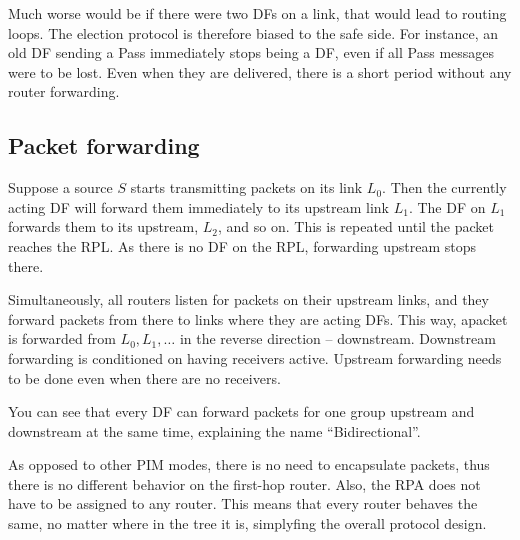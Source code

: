 Much worse would be if there were two DFs on a link, that would lead to routing loops. The election protocol
is therefore biased to the safe side. For instance, an old DF sending a Pass immediately
stops being a DF, even if all Pass messages were to be lost. Even when they are
delivered, there is a short period without any router forwarding.

\subsection{Packet forwarding}

Suppose a source $S$ starts transmitting packets on its link $L_0$. Then
the currently acting DF will forward them immediately to its upstream link $L_1$.
The DF on $L_1$ forwards them to its upstream, $L_2$, and so on. This is repeated
until the packet reaches the RPL. As there is no DF on the RPL, forwarding upstream stops
there.

Simultaneously, all routers listen for packets on their upstream links, and they
forward packets from there to links where they are acting DFs. This way, apacket
is forwarded from $L_0, L_1, \dots$ in the reverse direction -- downstream.
Downstream forwarding is conditioned on having receivers active. Upstream
forwarding needs to be done even when there are no receivers.

You can see that every DF can forward packets for one group upstream and
downstream at the same time, explaining the name ``Bidirectional''.

As opposed to other PIM modes, there is no need to encapsulate packets, thus
there is no different behavior on the first-hop router. Also, the RPA does not have
to be assigned to any router. This means that every router behaves the same, no
matter where in the tree it is, simplyfing the overall protocol design.
